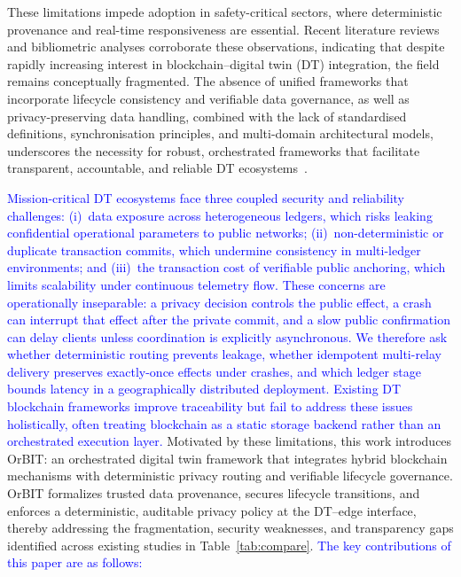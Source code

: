 \documentclass[final,5p,times,twocolumn]{elsarticle}
\begin{document}
These limitations impede adoption in safety-critical sectors, where deterministic provenance and real-time responsiveness are essential. Recent literature reviews and bibliometric analyses corroborate these observations, indicating that despite rapidly increasing interest in blockchain–digital twin (DT) integration, the field remains
conceptually fragmented. The absence of unified frameworks that incorporate lifecycle consistency and verifiable data
governance, as well as privacy-preserving data handling, combined with the lack of standardised definitions, synchronisation principles, and multi-domain architectural models, underscores the necessity for robust, orchestrated frameworks that facilitate transparent, accountable, and reliable DT ecosystems~\cite{ma2024examining}.
\smallskip
 
\noindent
\textcolor{blue}{Mission-critical DT ecosystems face three coupled security and reliability challenges:
(i)~data exposure across heterogeneous ledgers, which risks leaking confidential
operational parameters to public networks;
(ii)~non-deterministic or duplicate transaction commits, which undermine consistency in
multi-ledger environments; and
(iii)~the transaction cost of verifiable public anchoring, which limits scalability under
continuous telemetry flow. These concerns are operationally inseparable: a privacy decision controls the public effect, a crash can interrupt that effect after the private commit, and a slow public confirmation can delay clients unless coordination is explicitly asynchronous. We therefore ask whether deterministic routing prevents leakage, whether idempotent multi-relay delivery preserves exactly-once effects under crashes, and which ledger stage bounds latency in a geographically distributed deployment.
Existing DT blockchain frameworks improve traceability but fail to address these issues
holistically, often treating blockchain as a static storage backend rather than an
orchestrated execution layer.}
Motivated by these limitations, this work introduces OrBIT: an orchestrated digital twin
framework that integrates hybrid blockchain mechanisms with deterministic privacy routing
and verifiable lifecycle governance. OrBIT formalizes trusted data provenance, secures
lifecycle transitions, and enforces a deterministic, auditable privacy policy at the
DT--edge interface, thereby addressing the fragmentation, security weaknesses, and
transparency gaps identified across existing studies in Table~\ref{tab:compare}.
\textcolor{blue}{The key contributions of this paper are as follows:}
\end{document}

